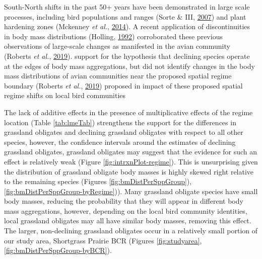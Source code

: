 \documentclass[12pt,twoside,openany]{reedthesis}
\begin{document}
South-North shifts in the past 50+ years have been demonstrated in large scale processes, including bird populations and ranges (Sorte \& III, \protect\hyperlink{ref-sorte2007poleward}{2007}) and plant hardening zones (Mckenney \emph{et al.}, \protect\hyperlink{ref-mckenney2014change}{2014}). A recent application of discontinuities in body mass distributions (Holling, \protect\hyperlink{ref-holling1992cross}{1992}) corroborated these previous observations of large-scale changes as manifested in the avian community (Roberts \emph{et al.}, \protect\hyperlink{ref-roberts2019shifting}{2019}). support for the hypothesis that declining species operate at the edges of body mass aggregations, but did not identify changes in the body mass distributions of avian communities near the proposed spatial regime boundary (Roberts \emph{et al.}, \protect\hyperlink{ref-roberts2019shifting}{2019}) proposed in impact of these proposed spatial regime shifts on local bird communities

The lack of additive effects in the presence of multiplicative effects of the regime location (Table \ref{tab:lmeTab}) strengthens the support for the differences in grassland obligates and declining grassland obligates with respect to all other species, however, the confidence intervals around the estimates of declining grassland obligates, grassland obligates may suggest that the evidence for such an effect is relatively weak (Figure \ref{fig:intrxnPlot-regime}). This is unsurprising given the distribution of grassland obligate body masses is highly skewed right relative to the remaining species (Figures \ref{fig:bmDistPerSppGroup}), \ref{fig:bmDistPerSppGroup-byRegime})). Many grassland obligate species have small body masses, reducing the probability that they will appear in different body mass aggregations, however, depending on the local bird community identities, local grassland obligates may all have similar body masses, removing this effect. The larger, non-declining grassland obligates occur in a relatively small portion of our study area, Shortgrass Prairie BCR (Figures \ref{fig:studyarea},\ref{fig:bmDistPerSppGroup-byBCR}).
\end{document}
